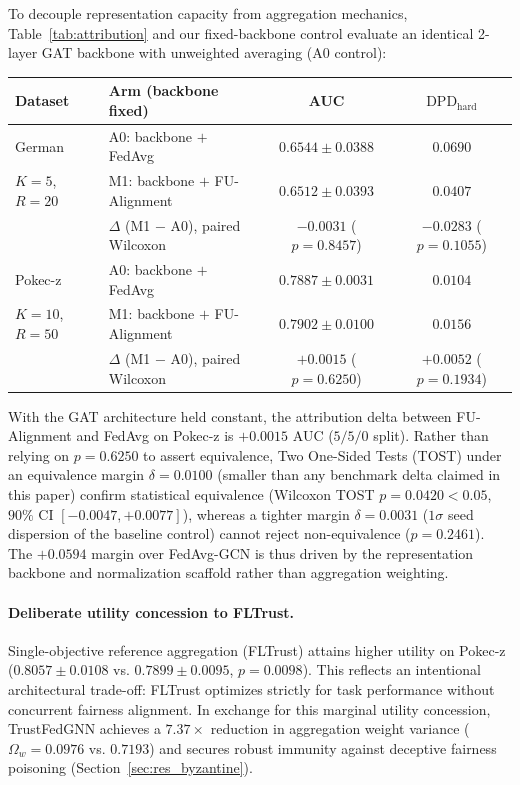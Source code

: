 \documentclass[preprint,12pt]{elsarticle}
\theoremstyle{plain}
\theoremstyle{definition}
\theoremstyle{remark}
\newcommand{\dpd}{\mathrm{DPD}}
\begin{document}
To decouple representation capacity from aggregation mechanics, Table~\ref{tab:attribution} and our fixed-backbone control evaluate an identical 2-layer GAT backbone with unweighted averaging (A0 control):
\begin{center}
\small
\begin{tabular}{llcc}
\toprule
\textbf{Dataset} & \textbf{Arm (backbone fixed)} & \textbf{AUC} & \textbf{$\dpd_{\mathrm{hard}}$} \\
\midrule
German & A0: backbone $+$ FedAvg & $0.6544 \pm 0.0388$ & $0.0690$ \\
$K=5$, $R=20$ & M1: backbone $+$ FU-Alignment & $0.6512 \pm 0.0393$ & $0.0407$ \\
 & $\Delta$ (M1 $-$ A0), paired Wilcoxon & $-0.0031$ ($p{=}0.8457$) & $-0.0283$ ($p{=}0.1055$) \\
\midrule
Pokec-z & A0: backbone $+$ FedAvg & $0.7887 \pm 0.0031$ & $0.0104$ \\
$K=10$, $R=50$ & M1: backbone $+$ FU-Alignment & $0.7902 \pm 0.0100$ & $0.0156$ \\
 & $\Delta$ (M1 $-$ A0), paired Wilcoxon & $+0.0015$ ($p{=}0.6250$) & $+0.0052$ ($p{=}0.1934$) \\
\bottomrule
\end{tabular}
\end{center}
With the GAT architecture held constant, the attribution delta between FU-Alignment and FedAvg on Pokec-z is $+0.0015$ AUC ($5/5/0$ split). Rather than relying on $p = 0.6250$ to assert equivalence, Two One-Sided Tests (TOST) under an equivalence margin $\delta = 0.0100$ (smaller than any benchmark delta claimed in this paper) confirm statistical equivalence (Wilcoxon TOST $p = 0.0420 < 0.05$, $90\%$ CI $[-0.0047, +0.0077]$), whereas a tighter margin $\delta = 0.0031$ ($1\sigma$ seed dispersion of the baseline control) cannot reject non-equivalence ($p = 0.2461$). The $+0.0594$ margin over FedAvg-GCN is thus driven by the representation backbone and normalization scaffold rather than aggregation weighting.

\paragraph{Deliberate utility concession to FLTrust.}
Single-objective reference aggregation (FLTrust) attains higher utility on Pokec-z ($0.8057 \pm 0.0108$ vs. $0.7899 \pm 0.0095$, $p = 0.0098$). This reflects an intentional architectural trade-off: FLTrust optimizes strictly for task performance without concurrent fairness alignment. In exchange for this marginal utility concession, TrustFedGNN achieves a $7.37\times$ reduction in aggregation weight variance ($\Omega_w = 0.0976$ vs. $0.7193$) and secures robust immunity against deceptive fairness poisoning (Section~\ref{sec:res_byzantine}).
\end{document}
